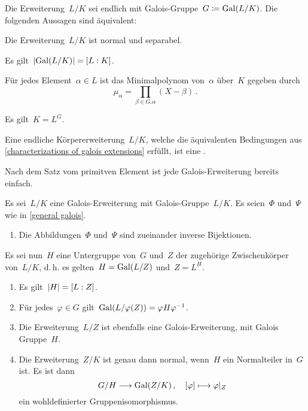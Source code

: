 \begin{proposition}
  \label{characterizations of galois extensions}
  Die Erweiterung~$L/K$ sei endlich mit Galois-Gruppe~$G \coloneqq \operatorname{Gal}(L/K)$.
  Die folgenden Aussagen sind äquivalent:
  \begin{equivlist}
    \item
      Die Erweiterung~$L/K$ ist normal und separabel.
    \item
      Es gilt~$\lvert \operatorname{Gal}(L/K) \rvert = [L : K]$.
    \item
      Für jedes Element~$\alpha \in L$ ist das Minimalpolynom von~$\alpha$ über~$K$ gegeben durch
      \[
        \mu_\alpha
        =
        \prod_{\beta \in G.\alpha}
        (X - \beta) \,.
      \]
    \item
      Es gilt~$K = L^G$.
  \end{equivlist}
\end{proposition}

\begin{definition}
  Eine endliche Körpererweiterung~$L/K$, welche die äquivalenten Bedingungen aus \cref{characterizations of galois extensions} erfüllt, ist eine .
\end{definition}

\begin{remark}
  Nach dem Satz vom primitven Element ist jede Galois-Erweiterung bereits einfach.
\end{remark}

\begin{theorem}
  Es sei~$L/K$ eine Galois-\hspace{0pt}Erweiterung mit Galois-Gruppe~$L/K$.
  Es seien~$\Phi$ und~$\Psi$ wie in \cref{general galois}.
  \begin{enumerate}
    \item
      Die Abbildungen~$\Phi$ und~$\Psi$ sind zueinander inverse Bijektionen.
  \end{enumerate}
  Es sei nun~$H$ eine Untergruppe von~$G$ und~$Z$ der zugehörige Zwischenkörper von~$L/K$, d.\,h. es gelten~$H = \operatorname{Gal}(L/Z)$ und~$Z = L^H$.
  \begin{enumerate}[resume*]
    \item
      Es gilt~$\lvert H\rvert = [L : Z]$.
    \item
      Für jedes~$\varphi \in G$ gilt~$\operatorname{Gal}(L / \varphi(Z)) = \varphi H \varphi^{-1}$.
    \item
      Die Erweiterung~$L/Z$ ist ebenfalls eine Galois-Erweiterung, mit Galois Gruppe~$H$.
    \item
      Die Erweiterung~$Z/K$ ist genau dann normal, wenn~$H$ ein Normalteiler in~$G$ ist.
      Es ist dann
      \[
        G / H
        \to
        \Gal(Z/K) \,,
        \quad
        \class{\varphi}
        \mapsto
        \restrict{\varphi}{Z}
      \]
      ein wohldefinierter Gruppenisomorphismus.
  \end{enumerate}
\end{theorem}





